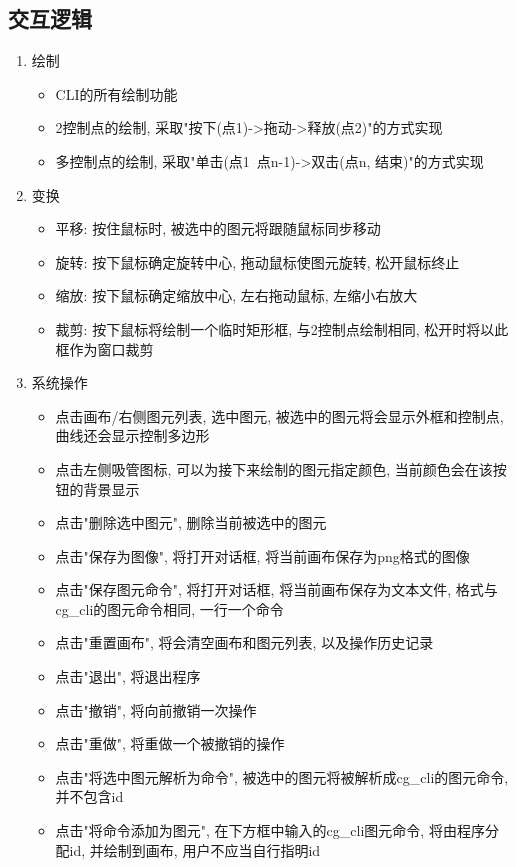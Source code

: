 \documentclass[a4paper,UTF8]{article}
\theoremstyle{definition}
\begin{document}
\subsection{交互逻辑}
\begin{enumerate}
  \item 绘制\begin{itemize}
    \item CLI的所有绘制功能
    \item 2控制点的绘制, 采取"按下(点1)->拖动->释放(点2)"的方式实现
    \item 多控制点的绘制, 采取"单击(点1~点n-1)->双击(点n, 结束)"的方式实现
  \end{itemize}
  \item 变换\begin{itemize}
    \item 平移: 按住鼠标时, 被选中的图元将跟随鼠标同步移动
    \item 旋转: 按下鼠标确定旋转中心, 拖动鼠标使图元旋转, 松开鼠标终止
    \item 缩放: 按下鼠标确定缩放中心, 左右拖动鼠标, 左缩小右放大
    \item 裁剪: 按下鼠标将绘制一个临时矩形框, 与2控制点绘制相同, 松开时将以此框作为窗口裁剪
  \end{itemize}
  \item 系统操作\begin{itemize}
    \item 点击画布/右侧图元列表, 选中图元, 被选中的图元将会显示外框和控制点, 曲线还会显示控制多边形
    \item 点击左侧吸管图标, 可以为接下来绘制的图元指定颜色, 当前颜色会在该按钮的背景显示
    \item 点击"删除选中图元", 删除当前被选中的图元
    \item 点击"保存为图像", 将打开对话框, 将当前画布保存为png格式的图像
    \item 点击"保存图元命令", 将打开对话框, 将当前画布保存为文本文件, 格式与cg\_cli的图元命令相同, 一行一个命令
    \item 点击"重置画布", 将会清空画布和图元列表, 以及操作历史记录
    \item 点击"退出", 将退出程序
    \item 点击"撤销", 将向前撤销一次操作
    \item 点击"重做", 将重做一个被撤销的操作
    \item 点击"将选中图元解析为命令", 被选中的图元将被解析成cg\_cli的图元命令, 并不包含id
    \item 点击"将命令添加为图元", 在下方框中输入的cg\_cli图元命令, 将由程序分配id, 并绘制到画布, 用户不应当自行指明id
  \end{itemize}
\end{enumerate}
\end{document}
